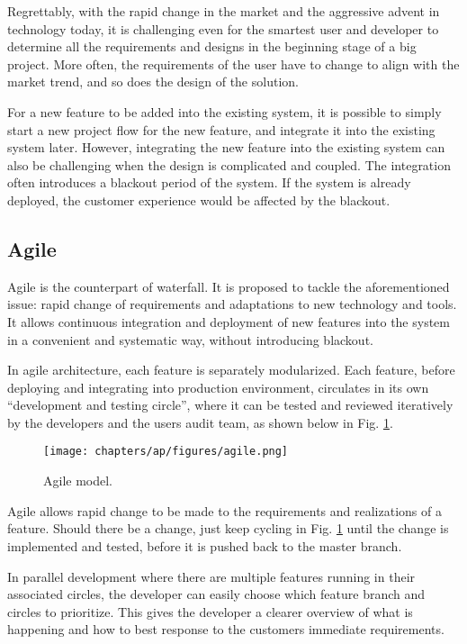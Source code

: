Regrettably, with the rapid change in the market and the aggressive advent in technology today, it is challenging even for the smartest user and developer to determine all the requirements and designs in the beginning stage of a big project. More often, the requirements of the user have to change to align with the market trend, and so does the design of the solution.

For a new feature to be added into the existing system, it is possible to simply start a new project flow for the new feature, and integrate it into the existing system later. However, integrating the new feature into the existing system can also be challenging when the design is complicated and coupled. The integration often introduces a blackout period of the system. If the system is already deployed, the customer experience would be affected by the blackout.

\subsection{Agile}

Agile is the counterpart of waterfall. It is proposed to tackle the aforementioned issue: rapid change of requirements and adaptations to new technology and tools. It allows continuous integration and deployment of new features into the system in a convenient and systematic way, without introducing blackout.

In agile architecture, each feature is separately modularized. Each feature, before deploying and integrating into production environment, circulates in its own ``development and testing circle'', where it can be tested and reviewed iteratively by the developers and the users audit team, as shown below in Fig. \ref{ch:cicd:fig:agile}.
\begin{figure}[htbp]
	\centering
	\texttt{[image: chapters/ap/figures/agile.png]}
	\caption{Agile model.} \label{ch:cicd:fig:agile}
\end{figure}

Agile allows rapid change to be made to the requirements and realizations of a feature. Should there be a change, just keep cycling in Fig. \ref{ch:cicd:fig:agile} until the change is implemented and tested, before it is pushed back to the master branch.

In parallel development where there are multiple features running in their associated circles, the developer can easily choose which feature branch and circles to prioritize. This gives the developer a clearer overview of what is happening and how to best response to the customers immediate requirements.

